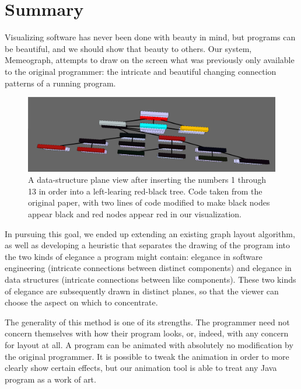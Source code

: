 \documentclass[11pt]{article}
\begin{document}
\section{Summary}

Visualizing software has never been done with beauty in mind, but programs can
be beautiful, and we should show that beauty to others.  Our system,
Memeograph\nocite{memeograph}, attempts to draw on the screen what was
previously only available to the original programmer: the intricate and
beautiful changing connection patterns of a running program.

\begin{figure}
\begin{center}
\includegraphics[width=5in]{figures/llrb.png}
\end{center}
\caption{A data-structure plane view after inserting the numbers 1 through 13
in order into a left-learing red-black tree.  Code taken from the original
paper\cite{llrb}, with two lines of code modified to make black nodes appear
black and red nodes appear red in our visualization.}
\end{figure}

In pursuing this goal, we ended up extending an existing graph layout
algorithm, as well as developing a heuristic that separates the drawing of the
program into the two kinds of elegance a program might contain: elegance in
software engineering (intricate connections between distinct components) and
elegance in data structures (intricate connections between like components).
These two kinds of elegance are subsequently drawn in distinct planes, so that
the viewer can choose the aspect on which to concentrate.

The generality of this method is one of its strengths.  The programmer need not
concern themselves with how their program looks, or, indeed, with any concern
for layout at all.  A program can be animated with absolutely no modification
by the original programmer.  It is possible to tweak the animation in order to
more clearly show certain effects, but our animation tool is able to treat any
Java program as a work of art.

\setlength{\baselineskip}{13pt} 

\end{document}
